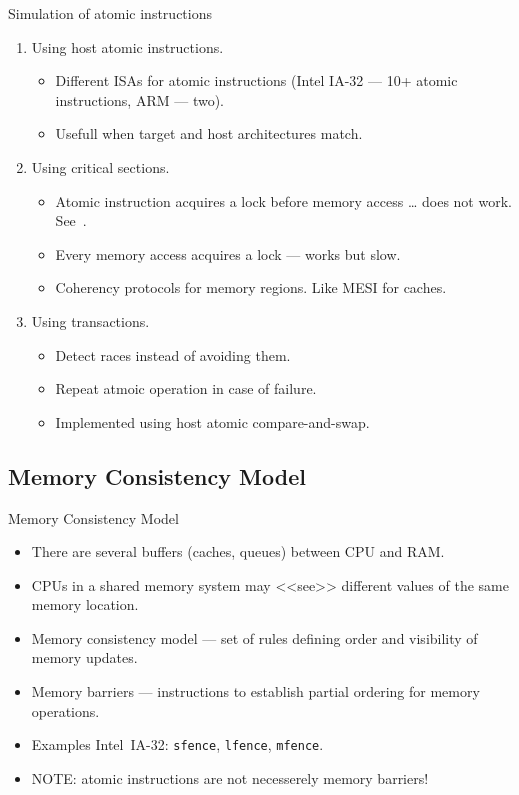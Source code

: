\begin{frame}{Simulation of atomic instructions}
  \begin{enumerate}
    \item Using host atomic instructions.
    \begin{itemize}
      \item Different ISAs for atomic instructions (Intel IA-32 --- 10+ atomic
        instructions, ARM --- two).
      \item Usefull when target and host architectures match. \pause
    \end{itemize}
    \item Using critical sections.
    \begin{itemize}
      \item Atomic instruction acquires a lock before memory access \pause
        \dots{} does not work. See~\cite{wang-coremu}.
      \item Every memory access acquires a lock --- works but slow. \pause
      \item Coherency protocols for memory regions. Like MESI for caches. \pause
    \end{itemize}
    \item Using transactions.
    \begin{itemize}
      \item Detect races instead of avoiding them.
      \item Repeat atmoic operation in case of failure.
      \item Implemented using host atomic compare-and-swap.
    \end{itemize}
  \end{enumerate}
\end{frame}

\subsection{Memory Consistency Model}

\begin{frame}{Memory Consistency Model}
  \begin{itemize}
    \item There are several buffers (caches, queues) between CPU and RAM.
    \item CPUs in a shared memory system may <<see>> different values of the
      same memory location.
    \item Memory consistency model --- set of rules defining order and
      visibility of memory updates.
    \pause
    \vfill
    \item Memory barriers --- instructions to establish partial ordering for
      memory operations.
    \item Examples Intel\reg~IA-32: \texttt{sfence}, \texttt{lfence},
      \texttt{mfence}.
    \item NOTE: atomic instructions are not necesserely memory barriers!
  \end{itemize}
\end{frame}

